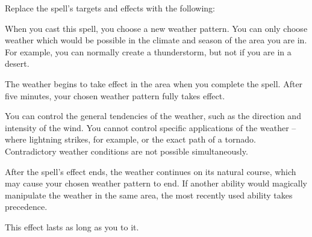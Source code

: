 Replace the spell's targets and effects with the following:
\begin{spellcontent}

\begin{augmenttargetinginfo}



\end{augmenttargetinginfo}


\begin{augmenteffects}



\spelleffect
When you cast this spell, you choose a new weather pattern.
You can only choose weather which would be possible in the climate and season of the area you are in.
For example, you can normally create a thunderstorm, but not if you are in a desert.

The weather begins to take effect in the area when you complete the spell.
After five minutes, your chosen weather pattern fully takes effect.

You can control the general tendencies of the weather, such as the direction and intensity of the wind.
You cannot control specific applications of the weather -- where lightning strikes, for example, or the exact path of a tornado.
Contradictory weather conditions are not possible simultaneously.

After the spell's effect ends, the weather continues on its natural course, which may cause your chosen weather pattern to end.
If another ability would magically manipulate the weather in the same area, the most recently used ability takes precedence.

This effect lasts as long as you  to it.








\end{augmenteffects}

\end{spellcontent}




